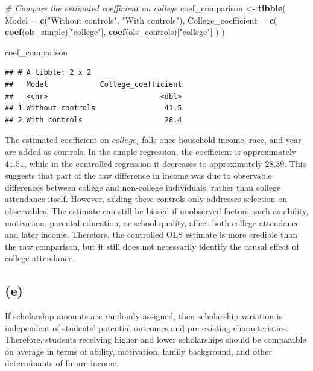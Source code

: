 \documentclass[
]{article}
\newenvironment{Shaded}{\begin{snugshade}}{\end{snugshade}}
\newcommand{\AttributeTok}[1]{\textcolor[rgb]{0.13,0.29,0.53}{#1}}
\newcommand{\CommentTok}[1]{\textcolor[rgb]{0.56,0.35,0.01}{\textit{#1}}}
\newcommand{\FunctionTok}[1]{\textcolor[rgb]{0.13,0.29,0.53}{\textbf{#1}}}
\newcommand{\NormalTok}[1]{#1}
\newcommand{\OtherTok}[1]{\textcolor[rgb]{0.56,0.35,0.01}{#1}}
\newcommand{\StringTok}[1]{\textcolor[rgb]{0.31,0.60,0.02}{#1}}
\begin{document}
\begin{Shaded}
\begin{Highlighting}[]
\CommentTok{\# Compare the estimated coefficient on college}
\NormalTok{coef\_comparison }\OtherTok{\textless{}{-}} \FunctionTok{tibble}\NormalTok{(}
  \AttributeTok{Model =} \FunctionTok{c}\NormalTok{(}\StringTok{"Without controls"}\NormalTok{, }\StringTok{"With controls"}\NormalTok{),}
  \AttributeTok{College\_coefficient =} \FunctionTok{c}\NormalTok{(}
    \FunctionTok{coef}\NormalTok{(ols\_simple)[}\StringTok{"college"}\NormalTok{],}
    \FunctionTok{coef}\NormalTok{(ols\_controls)[}\StringTok{"college"}\NormalTok{]}
\NormalTok{  )}
\NormalTok{)}

\NormalTok{coef\_comparison}
\end{Highlighting}
\end{Shaded}

\begin{verbatim}
## # A tibble: 2 x 2
##   Model            College_coefficient
##   <chr>                          <dbl>
## 1 Without controls                41.5
## 2 With controls                   28.4
\end{verbatim}

The estimated coefficient on \(college_i\) falls once household income,
race, and year are added as controls. In the simple regression, the
coefficient is approximately \(41.51\), while in the controlled
regression it decreases to approximately \(28.39\). This suggests that
part of the raw difference in income was due to observable differences
between college and non-college individuals, rather than college
attendance itself. However, adding these controls only addresses
selection on observables. The estimate can still be biased if unobserved
factors, such as ability, motivation, parental education, or school
quality, affect both college attendance and later income. Therefore, the
controlled OLS estimate is more credible than the raw comparison, but it
still does not necessarily identify the causal effect of college
attendance.

\subsection{(e)}\label{e}

If scholarship amounts are randomly assigned, then scholarship variation
is independent of students' potential outcomes and pre-existing
characteristics. Therefore, students receiving higher and lower
scholarships should be comparable on average in terms of ability,
motivation, family background, and other determinants of future income.
\end{document}
